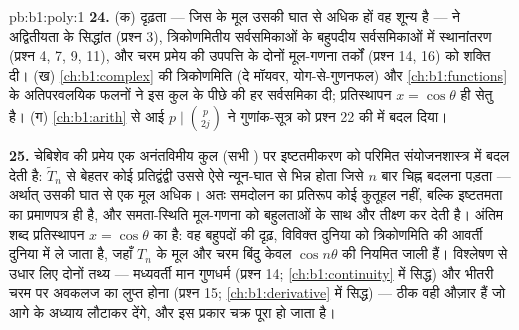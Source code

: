 \begin{solution}{pb:b1:poly:1}
\textbf{24.} (क) दृढ़ता --- जिस  के मूल उसकी घात से अधिक हों वह शून्य
है --- ने अद्वितीयता के सिद्धांत (प्रश्न 3), त्रिकोणमितीय सर्वसमिकाओं के
बहुपदीय सर्वसमिकाओं में स्थानांतरण (प्रश्न 4, 7, 9, 11), और चरम प्रमेय की
उपपत्ति के दोनों मूल-गणना तर्कों (प्रश्न 14, 16) को शक्ति दी। (ख)
\cref{ch:b1:complex} की त्रिकोणमिति (दे मॉयवर, योग-से-गुणनफल) और
\cref{ch:b1:functions} के अतिपरवलयिक फलनों ने इस कुल के पीछे की हर सर्वसमिका
दी; प्रतिस्थापन $x = \cos\theta$ ही सेतु है। (ग) \cref{ch:b1:arith} से आई
 $p \mid \binom p{2j}$ ने गुणांक-सूत्र को प्रश्न 22 की 
में बदल दिया।

\textbf{25.} चेबिशेव की प्रमेय एक अनंतविमीय कुल (सभी ) पर
इष्टतमीकरण को परिमित संयोजनशास्त्र में बदल देती है: $\widetilde T_n$ से
बेहतर कोई प्रतिद्वंद्वी उससे ऐसे न्यून-घात  से भिन्न होता जिसे $n$ बार
चिह्न बदलना पड़ता --- अर्थात् उसकी घात से एक मूल अधिक। अतः समदोलन का
प्रतिरूप कोई कुतूहल नहीं, बल्कि इष्टतमता का प्रमाणपत्र ही है, और समता-स्थिति
मूल-गणना को बहुलताओं के साथ और तीक्ष्ण कर देती है। अंतिम शब्द प्रतिस्थापन $x
= \cos\theta$ का है: वह बहुपदों की दृढ़, विविक्त दुनिया को त्रिकोणमिति की
आवर्ती दुनिया में ले जाता है, जहाँ $T_n$ के मूल और चरम बिंदु केवल $\cos
n\theta$ की नियमित जाली हैं। विश्लेषण से उधार लिए दोनों तथ्य --- मध्यवर्ती
मान गुणधर्म (प्रश्न 14; \cref{ch:b1:continuity} में सिद्ध) और भीतरी चरम पर
अवकलज का लुप्त होना (प्रश्न 15; \cref{ch:b1:derivative} में सिद्ध) --- ठीक
वही औज़ार हैं जो आगे के अध्याय लौटाकर देंगे, और इस प्रकार चक्र पूरा हो जाता
है।
\end{solution}
